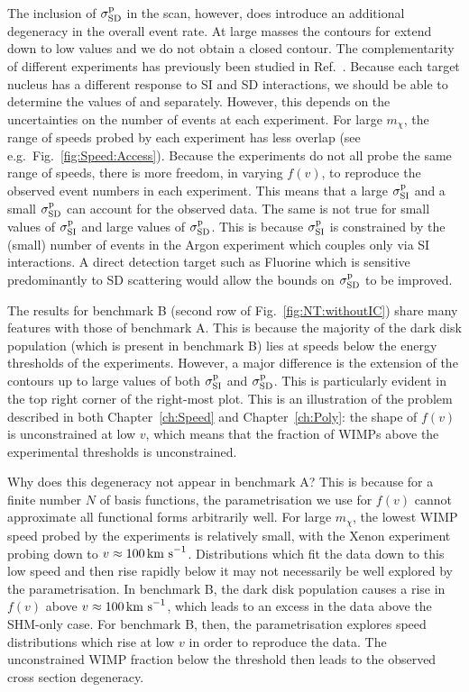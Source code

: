 The inclusion of $\sigmapsd$ in the scan, however, does introduce an additional degeneracy in the overall event rate. At large masses the contours for \sigmapsd extend down to low values and we do not obtain a closed contour. The complementarity of different experiments has previously been studied in Ref.~\cite{Cerdeno:2013}. Because each target nucleus has a different response to SI and SD interactions, we should be able to determine the values of \sigmapsi and \sigmapsd separately. However, this depends on the uncertainties on the number of events at each experiment. For large $m_\chi$, the range of speeds probed by each experiment has less overlap (see e.g.~Fig.~\ref{fig:Speed:Access}). Because the experiments do not all probe the same range of speeds, there is more freedom, in varying $f(v)$, to reproduce the observed event numbers in each experiment. This means that a large $\sigmapsi$ and a small $\sigmapsd$ can account for the observed data. The same is not true for small values of $\sigmapsi$ and large values of $\sigmapsd$. This is because $\sigmapsi$ is constrained by the (small) number of events in the Argon experiment which couples only via SI interactions. A direct detection target such as Fluorine which is sensitive predominantly to SD scattering would allow the bounds on $\sigmapsd$ to be improved.

The results for benchmark B (second row of Fig.~\ref{fig:NT:withoutIC}) share many features with those of benchmark A. This is because the majority of the dark disk population (which is present in benchmark B) lies at speeds below the energy thresholds of the experiments. However, a major difference is the extension of the contours up to large values of both $\sigmapsi$ and $\sigmapsd$. This is particularly evident in the top right corner of the right-most plot. This is an illustration of the problem described in both Chapter~\ref{ch:Speed} and Chapter~\ref{ch:Poly}: the shape of $f(v)$ is unconstrained at low $v$, which means that the fraction of WIMPs above the experimental thresholds is unconstrained.

Why does this degeneracy not appear in benchmark A? This is because for a finite number $N$ of basis functions, the parametrisation we use for $f(v)$ cannot approximate all functional forms arbitrarily well. For large $m_\chi$, the lowest WIMP speed probed by the experiments is relatively small, with the Xenon experiment probing down to $v \approx 100 \,\textrm{km s}^{-1}$. Distributions which fit the data down to this low speed and then rise rapidly below it may not necessarily be well explored by the parametrisation. In benchmark B, the dark disk population causes a rise in $f(v)$ above $v \approx 100 \,\textrm{km s}^{-1}$, which leads to an excess in the data above the SHM-only case. For benchmark B, then, the parametrisation explores speed distributions which rise at low $v$ in order to reproduce the data. The unconstrained WIMP fraction below the threshold then leads to the observed cross section degeneracy.

